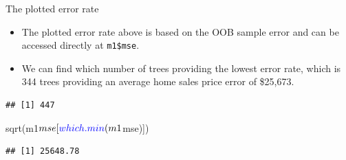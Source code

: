 \documentclass[10pt,ignorenonframetext,]{beamer}
\newenvironment{Shaded}{}{}
\newcommand{\KeywordTok}[1]{\textcolor[rgb]{0.00,0.00,1.00}{#1}}
\newcommand{\OperatorTok}[1]{#1}
\newcommand{\NormalTok}[1]{#1}
\providecommand{\tightlist}{%
  \setlength{\itemsep}{0pt}\setlength{\parskip}{0pt}}
\begin{document}
\begin{frame}[fragile]{The plotted error rate}

\begin{itemize}
\tightlist
\item
  The plotted error rate above is based on the OOB sample error and can
  be accessed directly at \texttt{m1\$mse}.
\item
  We can find which number of trees providing the lowest error rate,
  which is 344 trees providing an average home sales price error of
  \$25,673.
\end{itemize}

\begin{Shaded}
\end{Shaded}

\begin{verbatim}
## [1] 447
\end{verbatim}

\begin{Shaded}
\begin{Highlighting}[]
\KeywordTok{sqrt}\NormalTok{(m1}\OperatorTok{$}\NormalTok{mse[}\KeywordTok{which.min}\NormalTok{(m1}\OperatorTok{$}\NormalTok{mse)])}
\end{Highlighting}
\end{Shaded}

\begin{verbatim}
## [1] 25648.78
\end{verbatim}

\end{frame}
\end{document}
